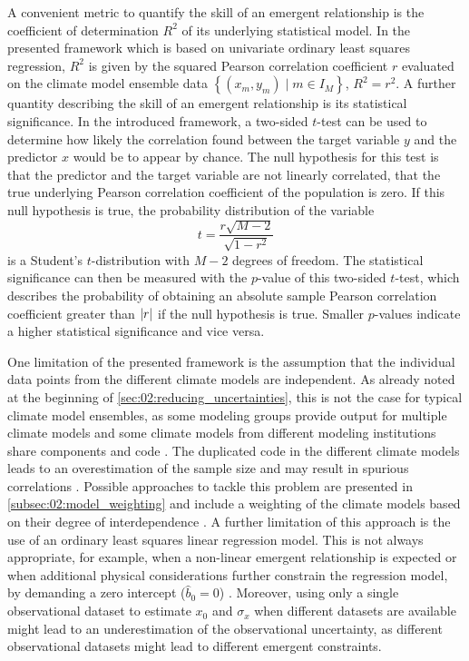 A convenient metric to quantify the skill of an emergent relationship is the
coefficient of determination $R^2$ of its underlying statistical model. In the
presented framework which is based on univariate ordinary least squares
regression, $R^2$ is given by the squared Pearson correlation coefficient $r$
evaluated on the climate model ensemble data $\left\{ \left( x_m, y_m \right)
\mid m \in I_M \right\}$, \ie{} $R^2 = r^2$. A further quantity describing the
skill of an emergent relationship is its statistical significance. In the
introduced framework, a two-sided $t$-test can be used to determine how likely
the correlation found between the target variable $y$ and the predictor $x$
would be to appear by chance. The null hypothesis for this test is that the
predictor and the target variable are not linearly correlated, \ie{} that the
true underlying Pearson correlation coefficient of the population is zero. If
this null hypothesis is true, the probability distribution of the variable
\begin{equation}
  t = \frac{r \sqrt{M - 2}}{\sqrt{1 - r^2}}
  \label{eq:02:t}
\end{equation}
is a Student's $t$-distribution with $M - 2$ degrees of freedom. The
statistical significance can then be measured with the $p$-value of this
two-sided $t$-test, which describes the probability of obtaining an absolute
sample Pearson correlation coefficient greater than $\abs*{r}$ if the null
hypothesis is true. Smaller $p$-values indicate a higher statistical
significance and vice versa.

One limitation of the presented framework is the assumption that the individual
data points from the different climate models are independent. As already noted
at the beginning of \cref{sec:02:reducing_uncertainties}, this is not the case
for typical climate model ensembles, as some modeling groups provide output for
multiple climate models and some climate models from different modeling
institutions share components and code \autocite{Knutti2013}. The duplicated
code in the different climate models leads to an overestimation of the sample
size and may result in spurious correlations \autocite{Sanderson2015}. Possible
approaches to tackle this problem are presented in
\cref{subsec:02:model_weighting} and include a weighting of the climate models
based on their degree of interdependence \autocite{Knutti2017a, Sanderson2015,
  Sanderson2017}. A further limitation of this approach is the use of an
ordinary least squares linear regression model. This is not always appropriate,
for example, when a non-linear emergent relationship is expected
\autocite{Nijsse2020} or when additional physical considerations further
constrain the regression model, \eg{} by demanding a zero intercept ($\hat{b}_0
= 0$) \autocite{Annan2020, JimenezdelaCuesta2019}. Moreover, using only a
single observational dataset to estimate $x_0$ and $\sigma_x$ when different
datasets are available might lead to an underestimation of the observational
uncertainty, as different observational datasets might lead to different
emergent constraints.

